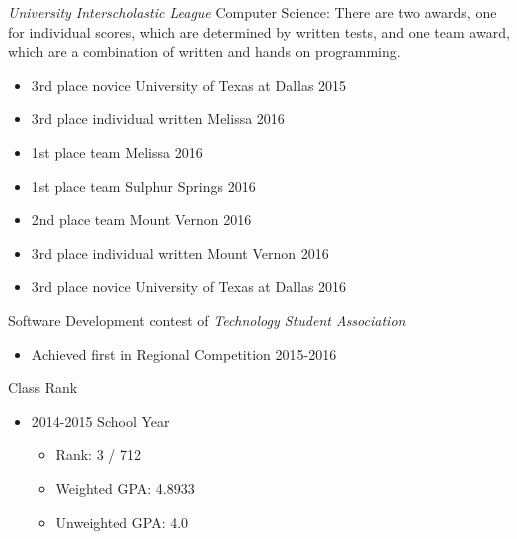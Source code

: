 \documentclass[margin]{res}
\begin{document}
\begin{resume}
	{\it University Interscholastic League} Computer Science: There are two awards, one for individual scores, which are determined by written tests, and one team award, which are a combination of written and hands on programming.
	\begin{itemize}
		\item 3rd place novice  \hfill University of Texas at Dallas 2015
		\item
			3rd place individual written \hfill Melissa 2016
		\item
			1st place team \hfill Melissa 2016
		\item
			1st place team \hfill Sulphur Springs 2016
		\item
			2nd place team \hfill Mount Vernon 2016
		\item
			3rd place individual written  \hfill Mount Vernon 2016
		\item 3rd place novice  \hfill University of Texas at Dallas 2016
	\end{itemize}
	
	Software Development contest of {\it Technology Student Association}
	\begin{itemize}
		\item 
		Achieved first in Regional Competition \hfill 2015-2016
	\end{itemize}
	
	Class Rank
	\begin{itemize}
		\item
			2014-2015 School Year
		\begin{itemize}
			\item
				Rank: 3 / 712
			\item
				Weighted GPA: 4.8933
			\item
				Unweighted GPA: 4.0
		\end{itemize}
	\end{itemize}
\end{resume}
\end{document}
